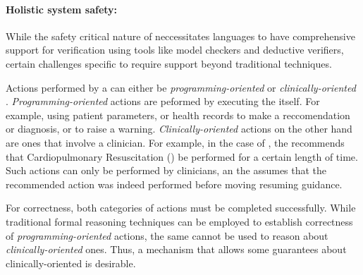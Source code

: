\paragraph{Holistic system safety:}

While the safety critical nature of \CDSSs{} neccessitates
\CIG{} languages to have comprehensive support for verification using
tools like model checkers and deductive verifiers, certain challenges
specific to \CDSSs{} require support beyond traditional techniques.

Actions performed by a \CDSS{} can either be \emph{programming-oriented}
or \emph{clinically-oriented} \cite{BoxwalaJBI04}. \emph{Programming-oriented}
actions are peformed by executing the \CIG{} itself. For example,
using patient parameters, or health records to make a reccomendation or diagnosis,
or to raise a warning. \emph{Clinically-oriented} actions on the other hand
are ones that involve a clinician. For example, in the case of \ACLS{},
the \CDSS{} recommends that Cardiopulmonary Resuscitation (\CPR{}) be performed
for a certain length of time. Such actions can only be performed by clinicians,
an the \CDSS{} assumes that the recommended action was indeed performed before
moving resuming guidance.

For correctness, both categories of actions must be completed
successfully. While traditional formal reasoning techniques can be employed
to establish correctness of \emph{programming-oriented} actions, the same
cannot be used to reason about \emph{clinically-oriented} ones.
Thus, a mechanism that allows some guarantees about clinically-oriented is
desirable.

